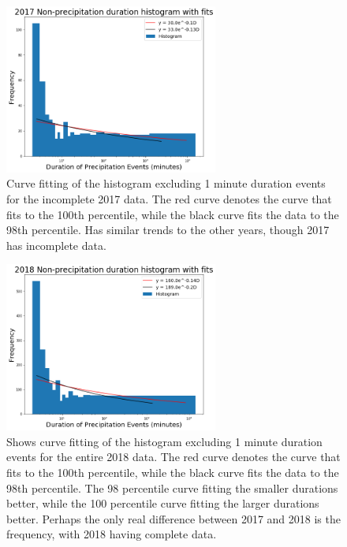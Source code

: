 \documentclass[11pt]{report}
\begin{document}
\clearpage
\begin{figure}[t]
\centering
\includegraphics[width=0.625\textwidth]{Figures/nonprecip_2017_new.png}
\caption[2017 Non-precipitation duration Exponentials with contrasting curve
  fitting] {\label{nonprecip17_redone}Curve fitting of the histogram
  excluding 1 minute duration events for the incomplete 2017 data. The red
  curve denotes the curve that fits to the 100th percentile, while the black
  curve fits the data to the 98th percentile. Has similar trends to the
  other years, though 2017 has incomplete data.}
\end{figure}

\begin{figure}[b]
  \centering
  \includegraphics[width=0.625\textwidth]{Figures/nonprecip_2018_new.png}
  \caption[2018 Non-precipitation duration Exponentials with contrasting curve fitting]
  {\label{nonprecip18_redone} Shows curve fitting of the histogram excluding
    1 minute duration events for the entire 2018 data. The red curve denotes
    the curve that fits to the 100th percentile, while the black curve fits
    the data to the 98th percentile. The 98 percentile curve fitting the
    smaller durations better, while the 100 percentile curve fitting the
    larger durations better.  Perhaps the only real difference between 2017
    and 2018 is the frequency, with 2018 having complete data.}
\end{figure}
\end{document}
